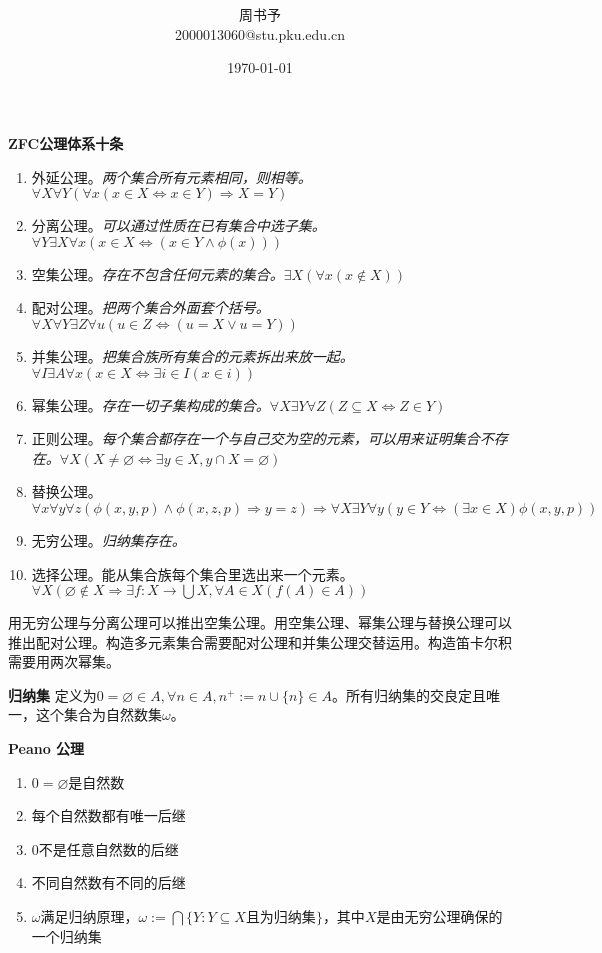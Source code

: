 \documentclass[UTF-8]{ctexart}
\title{\heiti\zihao{1} }
\author{\kaishu\zihao{-3} 周书予\\2000013060@stu.pku.edu.cn}
\date{\today}
\begin{document}
\textbf{ZFC公理体系十条}
\begin{enumerate}
	\item 外延公理。\textit{两个集合所有元素相同，则相等。}$\forall X \forall Y (\forall x(x \in X \Leftrightarrow x \in Y) \Rightarrow X = Y)$
	\item 分离公理。\textit{可以通过性质在已有集合中选子集。}$\forall Y \exists X \forall x(x \in X \Leftrightarrow (x \in Y \wedge \phi(x)))$
	\item 空集公理。\textit{存在不包含任何元素的集合。}$\exists X(\forall x(x \notin X))$
	\item 配对公理。\textit{把两个集合外面套个括号。}$\forall X\forall Y\exists Z \forall u(u \in Z\Leftrightarrow(u = X \vee u = Y))$
	\item 并集公理。\textit{把集合族所有集合的元素拆出来放一起。}$\forall I\exists A \forall x(x \in X \Leftrightarrow \exists i \in I(x \in i))$
	\item 幂集公理。\textit{存在一切子集构成的集合。}$\forall X\exists Y\forall Z(Z \subseteq X \Leftrightarrow Z \in Y)$
	\item 正则公理。\textit{每个集合都存在一个与自己交为空的元素，可以用来证明集合不存在。}$\forall X(X \neq \varnothing \Leftrightarrow \exists y \in X, y \cap X = \varnothing)$
	\item 替换公理。$\forall x \forall y \forall z(\phi(x, y, p) \wedge \phi(x, z, p) \Rightarrow y = z)\Rightarrow \forall X \exists Y \forall y(y \in Y \Leftrightarrow (\exists x \in X)\phi(x, y, p))$
	\item 无穷公理。\textit{归纳集存在。}
	\item 选择公理。能从集合族每个集合里选出来一个元素。$\forall X(\varnothing \notin X \Rightarrow \exists f: X \to \bigcup X, \forall A \in X(f(A) \in A))$
\end{enumerate}

用无穷公理与分离公理可以推出空集公理。用空集公理、幂集公理与替换公理可以推出配对公理。构造多元素集合需要配对公理和并集公理交替运用。构造笛卡尔积需要用两次幂集。

\textbf{归纳集} 定义为$0 = \varnothing \in A, \forall n \in A, n^+ := n \cup \{n\} \in A$。所有归纳集的交良定且唯一，这个集合为自然数集$\omega$。

\textbf{Peano 公理}\ 
\begin{enumerate}
	\item $0 = \varnothing$是自然数
	\item 每个自然数都有唯一后继
	\item $0$不是任意自然数的后继
	\item 不同自然数有不同的后继
	\item $\omega$满足归纳原理，$\omega := \bigcap \{Y: Y \subseteq X\mbox{且为归纳集}\}$，其中$X$是由无穷公理确保的一个归纳集
\end{enumerate}
\end{document}
